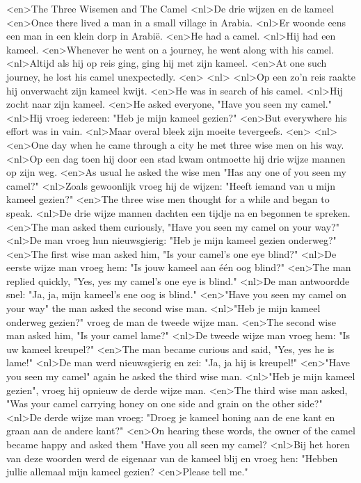 <en>The Three Wisemen and The Camel
<nl>De drie wijzen en de kameel
<en>Once there lived a man in a small village in Arabia.
<nl>Er woonde eens een man in een klein dorp in Arabië.
<en>He had a camel.
<nl>Hij had een kameel.
<en>Whenever he went on a journey, he went along with his camel.
<nl>Altijd als hij op reis ging, ging hij met zijn kameel.
<en>At one such journey, he lost his camel unexpectedly.
<en>
<nl>
<nl>Op een zo'n reis raakte hij onverwacht zijn kameel kwijt.
<en>He was in search of his camel.
<nl>Hij zocht naar zijn kameel.
<en>He asked everyone, "Have you seen my camel."
<nl>Hij vroeg iedereen: "Heb je mijn kameel gezien?"
<en>But everywhere his effort was in vain.
<nl>Maar overal bleek zijn moeite tevergeefs.
<en>
<nl>
<en>One day when he came through a city he met three wise men on his way.
<nl>Op een dag toen hij door een stad kwam ontmoette hij drie wijze mannen op zijn weg.
<en>As usual he asked the wise men "Has any one of you seen my camel?"
<nl>Zoals gewoonlijk vroeg hij de wijzen: "Heeft iemand van u mijn kameel gezien?"
<en>The three wise men thought for a while and began to speak.
<nl>De drie wijze mannen dachten een tijdje na en begonnen te spreken.
<en>The man asked them curiously, "Have you seen my camel on your way?"
<nl>De man vroeg hun nieuwsgierig: "Heb je mijn kameel gezien onderweg?"
<en>The first wise man asked him, "Is your camel’s one eye blind?"
<nl>De eerste wijze man vroeg hem: "Is jouw kameel aan één oog blind?"
<en>The man replied quickly, "Yes, yes my camel's one eye is blind."
<nl>De man antwoordde snel: "Ja, ja, mijn kameel's ene oog is blind."
<en>"Have you seen my camel on your way" the man asked the second wise man.
<nl>"Heb je mijn kameel onderweg gezien?" vroeg de man de tweede wijze man.
<en>The second wise man asked him, "Is your camel lame?"
<nl>De tweede wijze man vroeg hem: "Is uw kameel kreupel?"
<en>The man became curious and said, "Yes, yes he is lame!"
<nl>De man werd nieuwsgierig en zei: "Ja, ja hij is kreupel!"
<en>"Have you seen my camel" again he asked the third wise man.
<nl>"Heb je mijn kameel gezien", vroeg hij opnieuw de derde wijze man.
<en>The third wise man asked, "Was your camel carrying honey on one side and grain on the other side?"
<nl>De derde wijze man vroeg: "Droeg je kameel honing aan de ene kant en graan aan de andere kant?"
<en>On hearing these words, the owner of the camel became happy and asked them "Have you all seen my camel?
<nl>Bij het horen van deze woorden werd de eigenaar van de kameel blij en vroeg hen: "Hebben jullie allemaal mijn kameel gezien?
<en>Please tell me."

